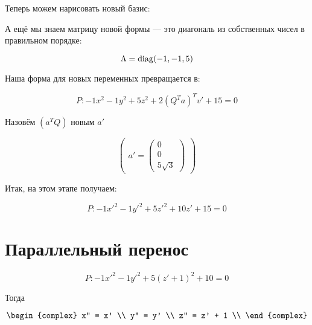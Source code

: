 \documentclass[12pt, a4paper]{article}
\begin{document}
    Теперь можем нарисовать новый базис:

    \vspace{40cm}


    А ещё мы знаем матрицу новой формы — это диагональ из собственных чисел в правильном порядке:

    \begin{equation}
        \Lambda = \operatorname{diag} (-1, -1, 5)
    \end{equation}

    Наша форма для новых переменных превращается в:

    \begin{equation}
        P: -1 x^2 -1 y^2 + 5 z^2 + 2 \left( Q^T a \right)^T v' + 15 = 0
    \end{equation}

    Назовём $\left( a^T Q \right)$ новым $a'$

    \begin{equation}
        \begin{pmatrix}
            a' = \begin{pmatrix}
                0 \\ 0 \\ 5 \sqrt{3}
            \end{pmatrix}
        \end{pmatrix}
    \end{equation}

    
    Итак, на этом этапе получаем:

    \begin{equation}
        P: -1 x'^2 -1 y'^2 + 5 z'^2 + 10 z' + 15 = 0
    \end{equation}


    \section{Параллельный перенос}

    
    \begin{equation}
        P: -1 x'^2 -1 y'^2 + 5 (z' + 1)^2 + 10 = 0
    \end{equation}

    Тогда

    \begin{equation}
        \begin{complex}
            x'' = x' \\
            y'' = y' \\
            z'' = z' + 1 \\
        \end{complex}
    \end{equation}
\end{document}
